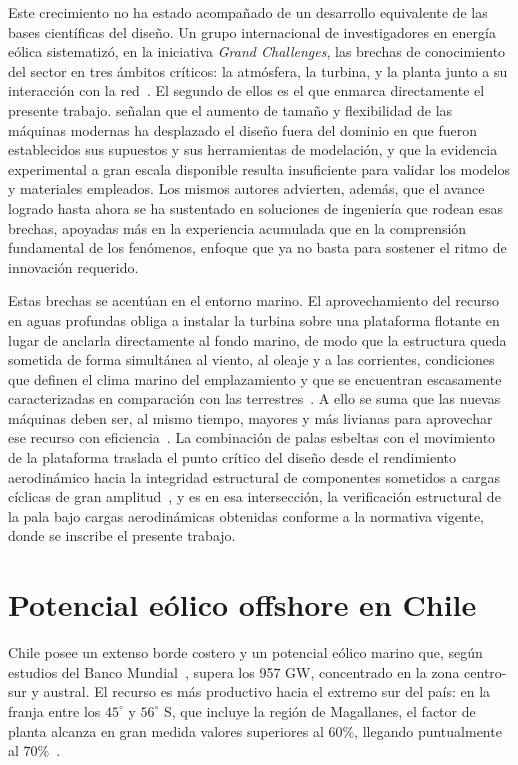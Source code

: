 Este crecimiento no ha estado acompañado de un desarrollo equivalente de las bases científicas del diseño. Un grupo internacional de investigadores en energía eólica sistematizó, en la iniciativa \textit{Grand Challenges}, las brechas de conocimiento del sector en tres ámbitos críticos: la atmósfera, la turbina, y la planta junto a su interacción con la red~\parencite{Veers2022}. El segundo de ellos es el que enmarca directamente el presente trabajo. \textcite{Veers2022} señalan que el aumento de tamaño y flexibilidad de las máquinas modernas ha desplazado el diseño fuera del dominio en que fueron establecidos sus supuestos y sus herramientas de modelación, y que la evidencia experimental a gran escala disponible resulta insuficiente para validar los modelos y materiales empleados. Los mismos autores advierten, además, que el avance logrado hasta ahora se ha sustentado en soluciones de ingeniería que rodean esas brechas, apoyadas más en la experiencia acumulada que en la comprensión fundamental de los fenómenos, enfoque que ya no basta para sostener el ritmo de innovación requerido.

Estas brechas se acentúan en el entorno marino. El aprovechamiento del recurso en aguas profundas obliga a instalar la turbina sobre una plataforma flotante en lugar de anclarla directamente al fondo marino, de modo que la estructura queda sometida de forma simultánea al viento, al oleaje y a las corrientes, condiciones que definen el clima marino del emplazamiento y que se encuentran escasamente caracterizadas en comparación con las terrestres~\parencite{Veers2022}. A ello se suma que las nuevas máquinas deben ser, al mismo tiempo, mayores y más livianas para aprovechar ese recurso con eficiencia~\parencite{Veers2022}. La combinación de palas esbeltas con el movimiento de la plataforma traslada el punto crítico del diseño desde el rendimiento aerodinámico hacia la integridad estructural de componentes sometidos a cargas cíclicas de gran amplitud~\parencite{Borg2015}, y es en esa intersección, la verificación estructural de la pala bajo cargas aerodinámicas obtenidas conforme a la normativa vigente, donde se inscribe el presente trabajo.

\section{Potencial eólico offshore en Chile}

Chile posee un extenso borde costero y un potencial eólico marino que, según estudios del Banco Mundial~\parencite{BancoMundial2020}, supera los 957 GW, concentrado en la zona centro-sur y austral. El recurso es más productivo hacia el extremo sur del país: en la franja entre los $45^\circ$ y $56^\circ$ S, que incluye la región de Magallanes, el factor de planta alcanza en gran medida valores superiores al $60\%$, llegando puntualmente al $70\%$~\parencite{Mattar2017}.

